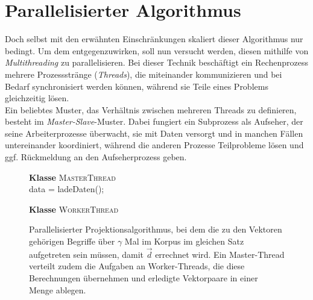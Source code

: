 \section{Parallelisierter Algorithmus}\label{sec:para-algo}

Doch selbst mit den erwähnten Einschränkungen skaliert dieser Algorithmus nur bedingt. Um dem entgegenzuwirken, soll nun
versucht werden, diesen mithilfe von \emph{Multithreading} zu parallelisieren. Bei dieser Technik beschäftigt ein Rechenprozess
mehrere Prozessstränge (\emph{Threads}), die miteinander kommunizieren und bei Bedarf synchronisiert werden können,
während sie Teile eines Problems gleichzeitig lösen.\\

Ein beliebtes Muster, das Verhältnis zwischen mehreren Threads zu definieren, besteht im \emph{Master-Slave}-Muster.
Dabei fungiert ein Subprozess als Aufseher, der seine Arbeiterprozesse überwacht, sie mit Daten versorgt und in manchen
Fällen untereinander koordiniert, während die anderen Prozesse Teilprobleme lösen und ggf. Rückmeldung an den Aufseherprozess
geben.\\

\begin{figure}[h]
  \centering
  \begin{algorithm}[H]
    \BlankLine
    \textbf{Klasse} \textsc{MasterThread} \\
      data = ladeDaten();\\

    \BlankLine
    \textbf{Klasse} \textsc{WorkerThread} \\
  \end{algorithm}
  \caption[Parallelisierter Projektionsalgorithmus]{Parallelisierter Projektionsalgorithmus, bei dem die zu den Vektoren gehörigen
  Begriffe über $\gamma$ Mal im Korpus im gleichen Satz aufgetreten sein müssen, damit $\vec{d}$ errechnet wird. Ein Master-Thread
  verteilt zudem die Aufgaben an Worker-Threads, die diese Berechnungen übernehmen und erledigte Vektorpaare in einer Menge ablegen.
  \label{fig:algo3}}
\end{figure}

